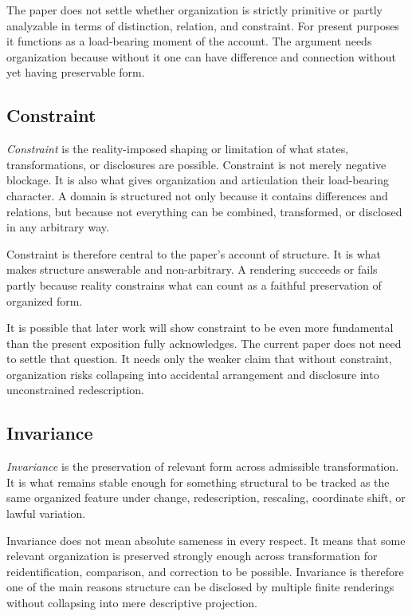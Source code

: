 \documentclass[11pt]{article}
\renewcommand{\emph}[1]{\textit{#1}}
\begin{document}
The paper does not settle whether organization is strictly primitive or partly analyzable in terms of distinction, relation, and constraint. For present purposes it functions as a load-bearing moment of the account. The argument needs organization because without it one can have difference and connection without yet having preservable form.

\subsection{Constraint}

\emph{Constraint} is the reality-imposed shaping or limitation of what states, transformations, or disclosures are possible. Constraint is not merely negative blockage. It is also what gives organization and articulation their load-bearing character. A domain is structured not only because it contains differences and relations, but because not everything can be combined, transformed, or disclosed in any arbitrary way.

Constraint is therefore central to the paper's account of structure. It is what makes structure answerable and non-arbitrary. A rendering succeeds or fails partly because reality constrains what can count as a faithful preservation of organized form. \cite{Wimsatt2007ReEngineeringPhilosophyBiology}

It is possible that later work will show constraint to be even more fundamental than the present exposition fully acknowledges. The current paper does not need to settle that question. It needs only the weaker claim that without constraint, organization risks collapsing into accidental arrangement and disclosure into unconstrained redescription.

\subsection{Invariance}

\emph{Invariance} is the preservation of relevant form across admissible transformation. It is what remains stable enough for something structural to be tracked as the same organized feature under change, redescription, rescaling, coordinate shift, or lawful variation. \cite{Cassirer1953SubstanceFunction,Nozick2001Invariances}

Invariance does not mean absolute sameness in every respect. It means that some relevant organization is preserved strongly enough across transformation for reidentification, comparison, and correction to be possible. Invariance is therefore one of the main reasons structure can be disclosed by multiple finite renderings without collapsing into mere descriptive projection.
\end{document}
